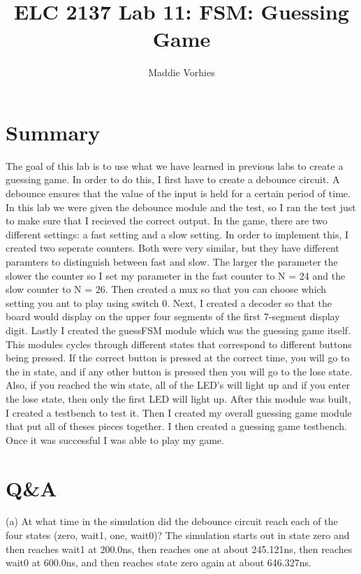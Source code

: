 \documentclass[11pt]{article}
\begin{document}
\title{ELC 2137 Lab 11: FSM: Guessing Game}
\author{Maddie Vorhies}

\maketitle


\section*{Summary}

The goal of this lab is to use what we have learned in previous labs to create a guessing game. In order to do this, I first have to create a debounce circuit. A debounce ensures that the value of the input is held for a certain period of time. In this lab we were given the debounce module and the test, so I ran the test just to make sure that I recieved the correct output. In the game, there are two different settings: a fast setting and a slow setting. In order to implement this, I created two seperate counters. Both were very similar, but they have different paramters to distinguish between fast and slow. The larger the parameter the slower the counter so I set my parameter in the fast counter to N = 24 and the slow counter to N = 26. Then  created a mux so that you can choose which setting you ant to play using switch 0. Next, I created a decoder so that the board would display on the upper four segments of the first 7-segment display digit. Lastly I created the guessFSM module which was the guessing game itself. This modules cycles through different states that correspond to different buttons being pressed. If the correct button is pressed at the correct time, you will go to the in state, and if any other button is pressed then you will go to the lose state. Also, if you reached the win state, all of the LED's will light up and if you enter the lose state, then only the first LED will light up. After this module was built, I created a testbench to test it. Then I created my overall guessing game module that put all of theses pieces together. I then created a guessing game testbench. Once it was successful I was able to play my game.


\section*{Q\&A}

(a) At what time in the simulation did the debounce circuit reach each of the four states (zero, wait1, one, wait0)? \newline
The simulation starts out in state zero and then reaches wait1 at 200.0ns, then reaches one at about 245.121ns, then reaches wait0 at 600.0ns, and then reaches state zero again at about 646.327ns. \newline 
\end{document}
